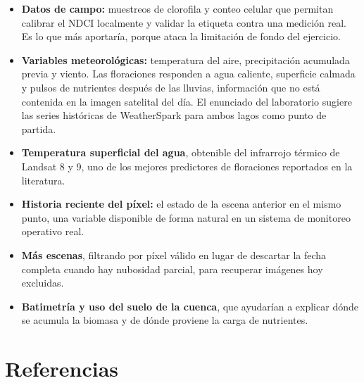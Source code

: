 \documentclass[11pt]{article}
\begin{document}
\begin{itemize}
    \item \textbf{Datos de campo:} muestreos de clorofila y conteo celular que permitan calibrar el NDCI localmente y validar la etiqueta contra una medición real. Es lo que más aportaría, porque ataca la limitación de fondo del ejercicio.
    \item \textbf{Variables meteorológicas:} temperatura del aire, precipitación acumulada previa y viento. Las floraciones responden a agua caliente, superficie calmada y pulsos de nutrientes después de las lluvias, información que no está contenida en la imagen satelital del día. El enunciado del laboratorio sugiere las series históricas de WeatherSpark para ambos lagos como punto de partida.
    \item \textbf{Temperatura superficial del agua}, obtenible del infrarrojo térmico de Landsat 8 y 9, uno de los mejores predictores de floraciones reportados en la literatura.
    \item \textbf{Historia reciente del píxel:} el estado de la escena anterior en el mismo punto, una variable disponible de forma natural en un sistema de monitoreo operativo real.
    \item \textbf{Más escenas}, filtrando por píxel válido en lugar de descartar la fecha completa cuando hay nubosidad parcial, para recuperar imágenes hoy excluidas.
    \item \textbf{Batimetría y uso del suelo de la cuenca}, que ayudarían a explicar dónde se acumula la biomasa y de dónde proviene la carga de nutrientes.
\end{itemize}

\section*{Referencias}
\end{document}
